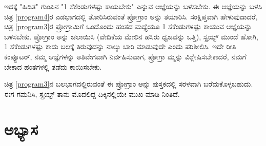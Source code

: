 ಇದಕ್ಕೆ "ಹಿಡಿತ" ಗುಂಪಿನ "1 ಸೆಕೆಂಡುಗಳಷ್ಟು   ಕಾಯಬೇಕು" ಎನ್ನುವ ಆಜ್ಞೆಯನ್ನು ಬಳಸಬೇಕು.  ಈ ಆಜ್ಞೆಯನ್ನು ಬಳಸಿ ಚಿತ್ರ \ref{program4}ರ ಎಡಭಾಗದಲ್ಲಿ ತೋರಿಸಿರುವಂತೆ ಪ್ರೋಗ್ರಾಂ ಅನ್ನು ತಯಾರಿಸಿ.  ಸಂಕ್ಷಿಪ್ತವಾಗಿ ಹೇಳುವುದಾದರೆ, ಚಿತ್ರ \ref{program3}ರ ಪ್ರೋಗ್ರಾಮಿಗೆ ಒಂದೊಂದು ಹಂತದ ಮಧ್ಯೆಯೂ 1 ಸೆಕೆಂಡುಗಳಷ್ಟು   ಕಾಯುವ ಆಜ್ಞೆಯನ್ನು ಬಳಸಬೇಕು.  ಪ್ರೋಗ್ರಾಂ ಅನ್ನು  ಚಲಾಯಿಸಿ (ವೇದಿಕೆಯ ಮೇಲಿನ ಹಸಿರು ಧ್ವಜವನ್ನು ಒತ್ತಿ),  ಸ್ಪ್ರಯ್ಟ್ ಮುಂದೆ ಹೋಗಿ, 1 ಸೆಕೆಂಡುಗಳಷ್ಟು ಕಾದು ಬಲಕ್ಕೆ ತಿರುವುದನ್ನು ನಾಲ್ಕು ಬಾರಿ ಮಾಡುವುದೇ ಎಂದು ಪರಿಶೀಲಿಸಿ.  ಇದೇ ರೀತಿ ಕಂಪ್ಯೂಟರ್, ನಮ್ಮ ಆಜ್ಞೆಗಳನ್ನು ಅತಿವೇಗವಾಗಿ ನಿರ್ವಹಿಸುವಾಗ, ಪ್ರೋಗ್ರಾ ಮ್ಮನ್ನು ವಿಶ್ಲೇಷಿಸಬೇಕಾದರೆ,  ನಮಗೆ ಬೇಕಾದ ಹಂತಗಳಲ್ಲಿ ತಡೆದು ಕಾಯಿಸಬೇಕು.

ಚಿತ್ರ \ref{program3}ನ ಬಲಭಾಗದಲ್ಲಿರುವಂತೆ  ಈ ಪ್ರೋಗ್ರಾಂ ಆನ್ನು ಪುಸ್ತಕದಲ್ಲಿ  ಸರಳವಾಗಿ ಬರೆದುಕೊಳ್ಳಬಹುದು.   ಈಗ ಗಮನಿಸಿ, ಸ್ಪ್ರಯ್ಟ್  ತಾನು ಮೊದಲಿದ್ದ ದಿಕ್ಕಿನಲ್ಲಿಯೇ ಮುಖ ಮಾಡಿ ನಿಂತಿದೆ. 

\section{ಅಭ್ಯಾಸ }
